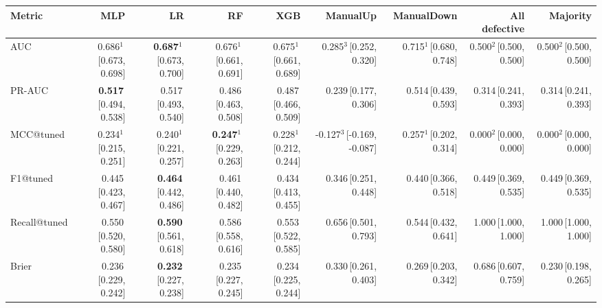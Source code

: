 \small
\begin{tabular}{lrrrrrrrr}
\toprule
Metric & MLP & LR & RF & XGB & ManualUp & ManualDown & All defective & Majority \\
\midrule
AUC & 0.686$^{1}$\,{\scriptsize[0.673, 0.698]} & \textbf{0.687$^{1}$}\,{\scriptsize[0.673, 0.700]} & 0.676$^{1}$\,{\scriptsize[0.661, 0.691]} & 0.675$^{1}$\,{\scriptsize[0.661, 0.689]} & 0.285$^{3}$\,{\scriptsize[0.252, 0.320]} & 0.715$^{1}$\,{\scriptsize[0.680, 0.748]} & 0.500$^{2}$\,{\scriptsize[0.500, 0.500]} & 0.500$^{2}$\,{\scriptsize[0.500, 0.500]} \\
PR-AUC & \textbf{0.517}\,{\scriptsize[0.494, 0.538]} & 0.517\,{\scriptsize[0.493, 0.540]} & 0.486\,{\scriptsize[0.463, 0.508]} & 0.487\,{\scriptsize[0.466, 0.509]} & 0.239\,{\scriptsize[0.177, 0.306]} & 0.514\,{\scriptsize[0.439, 0.593]} & 0.314\,{\scriptsize[0.241, 0.393]} & 0.314\,{\scriptsize[0.241, 0.393]} \\
MCC@tuned & 0.234$^{1}$\,{\scriptsize[0.215, 0.251]} & 0.240$^{1}$\,{\scriptsize[0.221, 0.257]} & \textbf{0.247$^{1}$}\,{\scriptsize[0.229, 0.263]} & 0.228$^{1}$\,{\scriptsize[0.212, 0.244]} & -0.127$^{3}$\,{\scriptsize[-0.169, -0.087]} & 0.257$^{1}$\,{\scriptsize[0.202, 0.314]} & 0.000$^{2}$\,{\scriptsize[0.000, 0.000]} & 0.000$^{2}$\,{\scriptsize[0.000, 0.000]} \\
F1@tuned & 0.445\,{\scriptsize[0.423, 0.467]} & \textbf{0.464}\,{\scriptsize[0.442, 0.486]} & 0.461\,{\scriptsize[0.440, 0.482]} & 0.434\,{\scriptsize[0.413, 0.455]} & 0.346\,{\scriptsize[0.251, 0.448]} & 0.440\,{\scriptsize[0.366, 0.518]} & 0.449\,{\scriptsize[0.369, 0.535]} & 0.449\,{\scriptsize[0.369, 0.535]} \\
Recall@tuned & 0.550\,{\scriptsize[0.520, 0.580]} & \textbf{0.590}\,{\scriptsize[0.561, 0.618]} & 0.586\,{\scriptsize[0.558, 0.616]} & 0.553\,{\scriptsize[0.522, 0.585]} & 0.656\,{\scriptsize[0.501, 0.793]} & 0.544\,{\scriptsize[0.432, 0.641]} & 1.000\,{\scriptsize[1.000, 1.000]} & 1.000\,{\scriptsize[1.000, 1.000]} \\
Brier & 0.236\,{\scriptsize[0.229, 0.242]} & \textbf{0.232}\,{\scriptsize[0.227, 0.238]} & 0.235\,{\scriptsize[0.227, 0.245]} & 0.234\,{\scriptsize[0.225, 0.244]} & 0.330\,{\scriptsize[0.261, 0.403]} & 0.269\,{\scriptsize[0.203, 0.342]} & 0.686\,{\scriptsize[0.607, 0.759]} & 0.230\,{\scriptsize[0.198, 0.265]} \\

\end{tabular}
